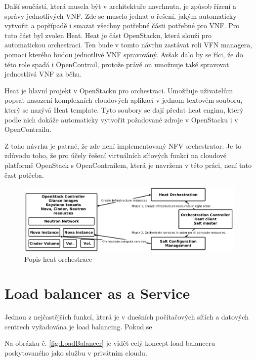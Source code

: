 Další součástí, která musela být v architektuře navrhnuta, je způsob řízení a správy jednotlivých VNF. Zde se muselo jednat o řešení, jakým automaticky vytvořit a popřípadě i smazat všechny potřebné části potřebné pro VNF. Pro tuto část byl zvolen Heat. Heat je část OpenStacku, která slouží pro automatickou orchestraci. Ten bude v tomto návrhu zastávat roli VFN managera, pomocí kterého budou jednotlivé VNF spravováný. Avšak dalo by se říci, že do této role spadá i OpenContrail, protože právě on umožnuje také spravovat jednostlivá VNF za běhu.  

Heat je hlavní projekt v OpenStacku pro orchestraci. Umožňuje uživatelům popsat nasazení komplexních cloudových aplikací v jednom textovém souboru, který se nazývá Heat template. Tyto soubory se dají předat heat enginu, který podle nich dokáže automaticky vytvořit požadované zdroje v OpenStacku i v OpenContrailu. 

Z toho návrhu je patrné, že zde není implementovaný NFV orchestrator. Je to zdůvodu toho, že pro účely řešení virtuálních síťových funkcí na cloudové platformě OpenStack s OpenContrailem, která je navržena v této práci, není tato čast potřeba. 

\begin{figure}[h]
\begin{centering}
\includegraphics[scale=0.21]{images/heat}
\par\end{centering}
\caption{Popis heat orchestrace\label{fig:heat}}
\end{figure}

\section{Load balancer as a Service}

Jednou z nejčastějších funkcí, která je v dnešních počítačových síťích a datových centrech vyžadována je load balancing. Pokud se 

Na obrázku č. \ref{fig:LoadBalancer} je vidět celý koncept load balanceru poskytovaného jako službu v privátním cloudu. 

